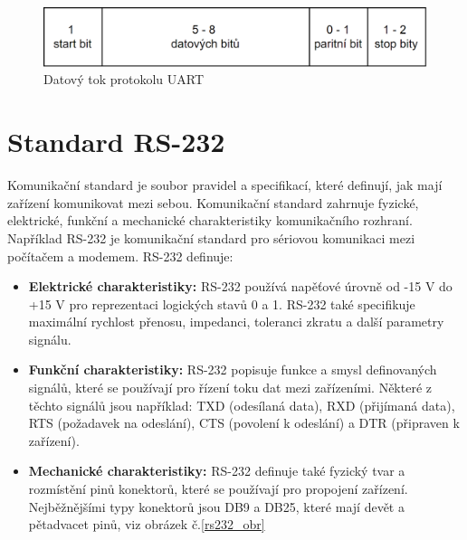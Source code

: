 \begin{figure}[!h]
    \begin{center}
        \includegraphics[scale=0.5]{obrazky/datovy ramec UART - final.png}
    \end{center}
    \caption{Datový tok protokolu UART}
    \label{UART packet}
\end{figure}

\section{Standard RS-232}
Komunikační standard je soubor pravidel a specifikací, které definují, jak mají zařízení komunikovat mezi sebou. Komunikační standard zahrnuje fyzické, elektrické, funkční a mechanické charakteristiky komunikačního rozhraní. Například RS-232 je komunikační standard pro sériovou komunikaci mezi počítačem a modemem.
RS-232 definuje:
\begin{itemize}
    \item \textbf{Elektrické charakteristiky:} RS-232 používá napěťové úrovně od -15 V do +15 V pro reprezentaci logických stavů 0 a 1. RS-232 také specifikuje maximální rychlost přenosu, impedanci, toleranci zkratu a další parametry signálu.
    \item \textbf{Funkční charakteristiky:} RS-232 popisuje funkce a smysl definovaných signálů, které se používají pro řízení toku dat mezi zařízeními. Některé z těchto signálů jsou například: TXD (odesílaná data), RXD (přijímaná data), RTS (požadavek na odeslání), CTS (povolení k odeslání) a DTR (připraven k zařízení).
    \item \textbf{Mechanické charakteristiky:} RS-232 definuje také fyzický tvar a rozmístění pinů konektorů, které se používají pro propojení zařízení. Nejběžnějšími typy konektorů jsou DB9 a DB25, které mají devět a pětadvacet pinů, viz obrázek č.\ref{rs232_obr} \cite{ser kom}
\end{itemize}

